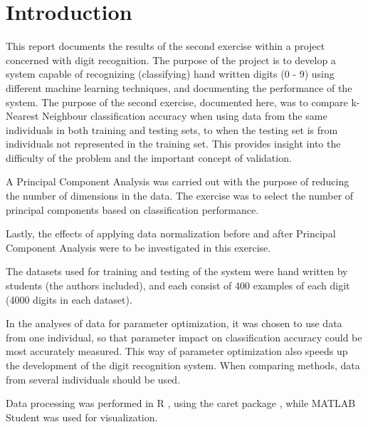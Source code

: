 \section{Introduction}
\label{sec:introduction}
This report documents the results of the second exercise within
a project concerned with digit recognition.
The purpose of the project is to develop a system capable of recognizing
(classifying) hand written digits (0 - 9) using different machine learning techniques,
and documenting the performance of the system.
The purpose of the second exercise, documented here, was to
compare k-Nearest Neighbour classification accuracy when using
data from the same individuals in both training and testing sets,
to when the testing set is from individuals not represented in the training set.
This provides insight into the difficulty of the problem and the important
concept of validation.

A Principal Component Analysis was carried out with the purpose
of reducing the number of dimensions in the data.
The exercise was to select the number of principal components
based on classification performance.

Lastly, the effects of applying data normalization before and after
Principal Component Analysis were to be investigated in this exercise.

The datasets used for training and testing of the system
were hand written by students (the authors included), and each
consist of 400 examples of each digit (4000 digits in each dataset).

In the analyses of data for parameter optimization,
it was chosen to use data from one individual,
so that parameter impact on classification accuracy
could be most accurately measured. This way of parameter
optimization also speeds up the development of the digit recognition system.
When comparing methods, data from several individuals should be used.

Data processing was performed in R \citep{R}, using the caret package \citep{caret},
while MATLAB Student \citep{matlabstudent} was used for visualization.

%
